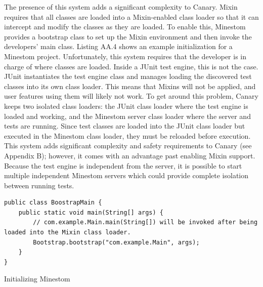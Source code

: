 \documentclass[12pt]{article}
\begin{document}
\begin{onehalfspacing}
The presence of this system adds a significant complexity to Canary.
Mixin requires that all classes are loaded into a Mixin-enabled class
loader so that it can intercept and modify the classes as they are
loaded. To enable this, Minestom provides a bootstrap class to set up
the Mixin environment and then invoke the developers' main class.
Listing AA.4 shows an example initialization for a Minestom project.
Unfortunately, this system requires that the developer is in charge of
where classes are loaded. Inside a JUnit test engine, this is not the
case. JUnit instantiates the test engine class and manages loading the
discovered test classes into its own class loader. This means that
Mixins will not be applied, and user features using them will likely not
work. To get around this problem, Canary keeps two isolated class
loaders: the JUnit class loader where the test engine is loaded and
working, and the Minestom server class loader where the server and tests
are running. Since test classes are loaded into the JUnit class loader
but executed in the Minestom class loader, they must be reloaded before
execution. This system adds significant complexity and safety
requirements to Canary (see Appendix B); however, it comes with an
advantage past enabling Mixin support. Because the test engine is
independent from the server, it is possible to start multiple
independent Minestom servers which could provide complete isolation
between running tests.

\begin{listing}[H]
\begin{verbatim}
public class BoostrapMain {
    public static void main(String[] args) {
        // com.example.Main.main(String[]) will be invoked after being loaded into the Mixin class loader.
        Bootstrap.bootstrap("com.example.Main", args);
    }
}
\end{verbatim}
\caption{Initializing Minestom}
\label{lst:aa4}
\end{listing}








\end{onehalfspacing}
\end{document}
